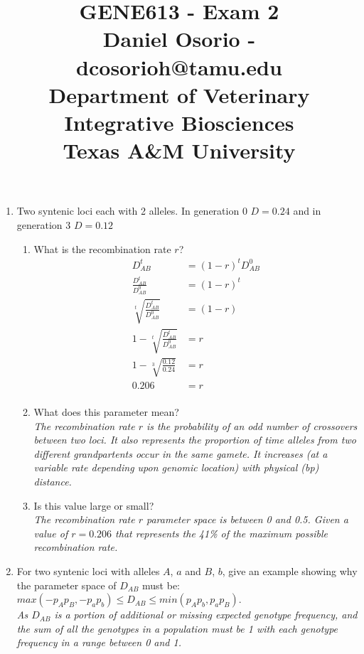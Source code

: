 \documentclass[12pt,a4paper]{paper}
\begin{document}
\title{GENE613 - Exam 2\\\small{Daniel Osorio - dcosorioh@tamu.edu\\Department of Veterinary Integrative Biosciences\\Texas A\&M University}}
\maketitle

\begin{enumerate}
\item Two syntenic loci each with 2 alleles. In generation 0 $D = 0.24$ and in generation 3 $D = 0.12$
\begin{enumerate}
\item What is the recombination rate $r$?
\begin{equation*}
\begin{split}
D^{t}_{AB} &= (1-r)^{t}D^{0}_{AB}\\
\frac{D^{t}_{AB}}{D^{0}_{AB}} &= (1-r)^{t}\\
\sqrt[t]{\frac{D^{t}_{AB}}{D^{0}_{AB}}} &= (1-r)\\
1-\sqrt[t]{\frac{D^{t}_{AB}}{D^{0}_{AB}}} &= r\\
1-\sqrt[3]{\frac{0.12}{0.24}} &= r\\
0.206 &= r\\
\end{split}
\end{equation*}
\item What does this parameter mean?\\
\textit{The recombination rate $r$ is the probability of an odd number of crossovers between two loci. It also represents the proportion of time alleles from two different grandpartents occur in the same gamete. It increases (at a variable rate depending upon genomic location) with physical (bp) distance.}
\item Is this value large or small?\\
\textit{The recombination rate $r$ parameter space is between 0 and 0.5. Given a value of  $r = 0.206$ that represents the 41\% of the maximum possible recombination rate.}
\end{enumerate}
\item For two syntenic loci with alleles $A$, $a$ and $B$, $b$, give an example showing why the parameter space of $D_{AB}$ must be: $max(-p_{A}p_{B},-p_{a}p_{b}) \leq D_{AB} \leq min(p_{A}p_{b},p_{a}p_{B})$.\\
\textit{As $D_{AB}$ is a portion of additional or missing expected genotype frequency, and  the sum of all the genotypes in a population must be 1 with each genotype frequency in a range between 0 and 1.}

\end{enumerate}
\end{document}
